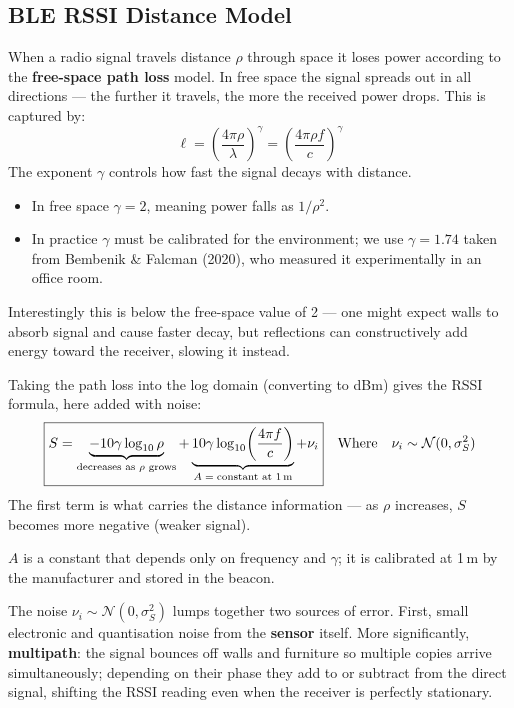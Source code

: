 \documentclass[12pt, a4paper]{article}
\begin{document}
\subsection*{BLE RSSI Distance Model}
When a radio signal travels distance $\rho$ through space it loses power
according to the \textbf{free-space path loss} model. In free space the
signal spreads out in all directions ---  the further
it travels, the more the received
power drops. This is captured by:
\[
  \ell = \left(\frac{4\pi\rho}{\lambda}\right)^{\!\gamma}
       = \left(\frac{4\pi\rho f}{c}\right)^{\!\gamma}
\]
The exponent $\gamma$ controls how fast the signal decays with distance.
\begin{itemize}
  \item In free space $\gamma = 2$, meaning power falls as $1/\rho^2$.
  \item In practice $\gamma$ must be calibrated for the environment;
we use $\gamma = 1.74$ taken from Bembenik \& Falcman (2020), who
measured it experimentally in an office room.
\end{itemize}
\begin{warnbox}
Interestingly this is below the free-space value of 2 --- one might
expect walls to absorb signal and cause faster decay, but reflections
can constructively add energy toward the receiver, slowing it instead.
\end{warnbox}
Taking the path loss into the log domain (converting to dBm) gives the
RSSI formula, here added with noise:
\[
  \boxed{S = \underbrace{-10\gamma\log_{10}\rho}_{\text{decreases as }\rho\text{ grows}}
           + \underbrace{10\gamma\log_{10}\!\left(\frac{4\pi f}{c}\right)}_{A\;=\;\text{constant at 1\,m}} + \nu_i} \quad \text{Where} \quad
  \nu_i \sim \mathcal{N}(0,\sigma_S^2)
\]
The first term is what carries the distance information --- as $\rho$
increases, $S$ becomes more negative (weaker signal).

$A$ is a constant that depends only on frequency and $\gamma$; it is
calibrated at 1\,m by the manufacturer and stored in the beacon.

The noise $\nu_i \sim \mathcal{N}(0, \sigma_S^2)$ lumps together
two sources of error.
First, small electronic and quantisation noise from the \textbf{sensor}
itself.
More significantly, \textbf{multipath}: the signal bounces off walls
and furniture so multiple copies arrive simultaneously; depending on
their phase they add to or subtract from the direct signal, shifting
the RSSI reading even when the receiver is perfectly stationary.
\end{document}
